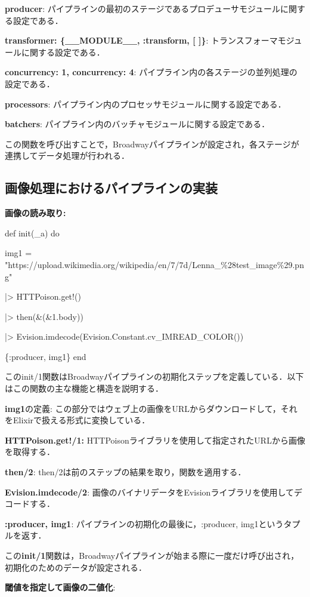 \documentclass[a4paper]{jreport}	%
\begin{document}
\textbf{producer}: パイプラインの最初のステージであるプロデューサモジュールに関する設定である．

\textbf{transformer: \{\_\_MODULE\_\_, :transform, [ ]\}}: トランスフォーマモジュールに関する設定である．

\textbf{concurrency: 1, concurrency: 4}: パイプライン内の各ステージの並列処理の設定である．

\textbf{processors}: パイプライン内のプロセッサモジュールに関する設定である．

\textbf{batchers}: パイプライン内のバッチャモジュールに関する設定である．

この関数を呼び出すことで，Broadwayパイプラインが設定され，各ステージが連携してデータ処理が行われる．
\subsection{画像処理におけるパイプラインの実装}

\textbf{画像の読み取り:}

def init(\_a) do

    img1 = 
      "https://upload.wikimedia.org/wikipedia/en/7/7d/Lenna\_\%28test\_image\%29.png"
      
  |> HTTPoison.get!()
  
  |> then(\&(\&1.body))
  
  |> Evision.imdecode(Evision.Constant.cv\_IMREAD\_COLOR()) 
  
  \{:producer, img1\}
end

このinit/1関数はBroadwayパイプラインの初期化ステップを定義している．以下はこの関数の主な機能と構造を説明する．

\textbf{img1}の定義: この部分ではウェブ上の画像をURLからダウンロードして，それをElixirで扱える形式に変換している．

\textbf{HTTPoison.get!/1:} HTTPoisonライブラリを使用して指定されたURLから画像を取得する．

\textbf{then/2}: then/2は前のステップの結果を取り，関数を適用する．

\textbf{Evision.imdecode/2}: 画像のバイナリデータをEvisionライブラリを使用してデコードする．

\textbf{{:producer, img1}}: パイプラインの初期化の最後に，{:producer, img1}というタプルを返す．

この\textbf{init/1}関数は，Broadwayパイプラインが始まる際に一度だけ呼び出され，初期化のためのデータが設定される．

\textbf{閾値を指定して画像の二値化}:
\end{document}
